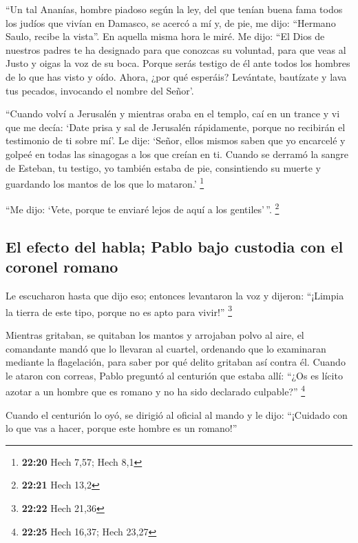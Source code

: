  ``Un tal Ananías, hombre piadoso según la ley, del que
tenían buena fama todos los judíos que vivían en Damasco,
 se acercó a mí y, de pie, me dijo: ``Hermano Saulo,
recibe la vista''. En aquella misma hora le miré.  Me
dijo: ``El Dios de nuestros padres te ha designado para que conozcas su
voluntad, para que veas al Justo y oigas la voz de su boca.
 Porque serás testigo de él ante todos los hombres de lo
que has visto y oído.  Ahora, ¿por qué esperáis?
Levántate, bautízate y lava tus pecados, invocando el nombre del Señor'.

 ``Cuando volví a Jerusalén y mientras oraba en el
templo, caí en un trance  y vi que me decía: `Date prisa
y sal de Jerusalén rápidamente, porque no recibirán el testimonio de ti
sobre mí'.  Le dije: `Señor, ellos mismos saben que yo
encarcelé y golpeé en todas las sinagogas a los que creían en ti.
 Cuando se derramó la sangre de Esteban, tu testigo, yo
también estaba de pie, consintiendo su muerte y guardando los mantos de
los que lo mataron.' \footnote{\textbf{22:20} Hech 7,57; Hech 8,1}

 ``Me dijo: `Vete, porque te enviaré lejos de aquí a los
gentiles'\,''. \footnote{\textbf{22:21} Hech 13,2}

\hypertarget{el-efecto-del-habla-pablo-bajo-custodia-con-el-coronel-romano}{%
\subsection{El efecto del habla; Pablo bajo custodia con el coronel
romano}\label{el-efecto-del-habla-pablo-bajo-custodia-con-el-coronel-romano}}

 Le escucharon hasta que dijo eso; entonces levantaron la
voz y dijeron: ``¡Limpia la tierra de este tipo, porque no es apto para
vivir!'' \footnote{\textbf{22:22} Hech 21,36}

 Mientras gritaban, se quitaban los mantos y arrojaban
polvo al aire,  el comandante mandó que lo llevaran al
cuartel, ordenando que lo examinaran mediante la flagelación, para saber
por qué delito gritaban así contra él.  Cuando le ataron
con correas, Pablo preguntó al centurión que estaba allí: ``¿Os es
lícito azotar a un hombre que es romano y no ha sido declarado
culpable?'' \footnote{\textbf{22:25} Hech 16,37; Hech 23,27}

 Cuando el centurión lo oyó, se dirigió al oficial al
mando y le dijo: ``¡Cuidado con lo que vas a hacer, porque este hombre
es un romano!''

